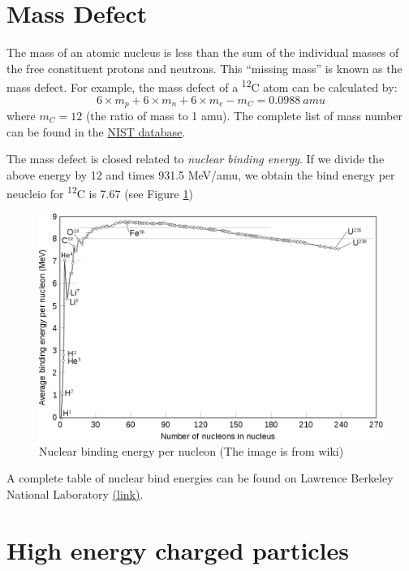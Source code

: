 \documentclass[]{book}
\theoremstyle{definition}
\theoremstyle{definition}
\theoremstyle{definition}
\theoremstyle{remark}
\begin{document}
\section{Mass Defect}\label{mass-defect}

The mass of an atomic nucleus is less than the sum of the individual
masses of the free constituent protons and neutrons. This ``missing
mass'' is known as the mass defect. For example, the mass defect of a
\textsuperscript{12}C atom can be calculated by:
\[ 6 \times m_p + 6 \times m_n + 6 \times m_e - m_{C} = 0.0988\ amu\]
where \(m_C = 12\) (the ratio of mass to 1 amu). The complete list of
mass number can be found in the
\href{https://physics.nist.gov/cgi-bin/Compositions/stand_alone.pl}{NIST
database}.

The mass defect is closed related to \emph{nuclear binding energy}. If
we divide the above energy by 12 and times 931.5 MeV/amu, we obtain the
bind energy per neucleio for \textsuperscript{12}C is 7.67 (see Figure
\ref{fig:stability})

\begin{figure}

{\centering \includegraphics[width=0.8\linewidth]{figures/binding_energy} 

}

\caption{Nuclear binding energy per nucleon (The image is from wiki)}\label{fig:stability}
\end{figure}

A complete table of nuclear bind energies can be found on Lawrence
Berkeley National Laboratory
\href{http://xdb.lbl.gov/Section1/Table_1-1.pdf}{(link)}.

\section{High energy charged particles}\label{einstein}
\end{document}
